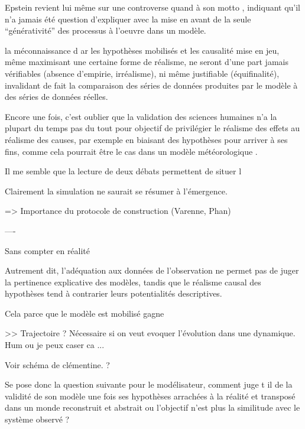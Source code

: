 Epstein revient lui même sur une controverse quand à son motto \autocite{Epstein2006}, indiquant qu'il n'a jamais été question d'expliquer avec la mise en avant de la seule \enquote{générativité} des processus à l'oeuvre dans un modèle. 

la méconnaissance d ar les hypothèses mobilisés et les causalité mise en jeu, même maximisant une certaine forme de réalisme, ne seront d'une part jamais vérifiables (absence d'empirie, irréalisme), ni même justifiable (équifinalité), invalidant de fait la comparaison des séries de données produites par le modèle à des séries de données réelles. 

Encore une fois, c'est oublier que la validation des sciences humaines n'a la plupart du temps pas du tout pour objectif de privilégier le réalisme des effets au réalisme des causes, par exemple en biaisant des hypothèses pour arriver à ses fins, comme cela pourrait être le cas dans un modèle météorologique \autocite{Kuppers2005}. 

Il me semble que la lecture de deux débats permettent de situer l


Clairement la simulation ne saurait se résumer à l'émergence. 



=> Importance du protocole de construction (Varenne, Phan)

----

Sans compter en réalité 

Autrement dit, l’adéquation aux données de l’observation ne permet pas de juger la pertinence explicative des modèles, tandis que le réalisme causal des hypothèses tend à contrarier leurs potentialités descriptives.

Cela parce que le modèle est mobilisé gagne



>> Trajectoire ? Nécessaire si on veut evoquer l'évolution dans une dynamique. Hum ou je peux caser ca ...







Voir schéma de clémentine. ?

Se pose donc la question suivante pour le modélisateur, comment juge t il de la validité de son modèle une fois ses hypothèses arrachées à la réalité et transposé dans un monde reconstruit et abstrait ou l'objectif n'est plus la similitude avec le système observé ?



